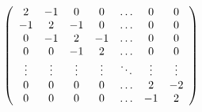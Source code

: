 \[
\left( \begin{array}{c c c c c c c} 2 & - 1 & 0 & 0 & \dots & 0 & 0 \\ - 1 & 2 & - 1 & 0 & \dots & 0 & 0 \\ 0 & - 1 & 2 & - 1 & \dots & 0 & 0 \\ 0 & 0 & - 1 & 2 & \dots & 0 & 0 \\ \vdots & \vdots & \vdots & \vdots & \ddots & \vdots & \vdots \\ 0 & 0 & 0 & 0 & \dots & 2 & - 2 \\ 0 & 0 & 0 & 0 & \dots & - 1 & 2 \end{array} \right)
\]

